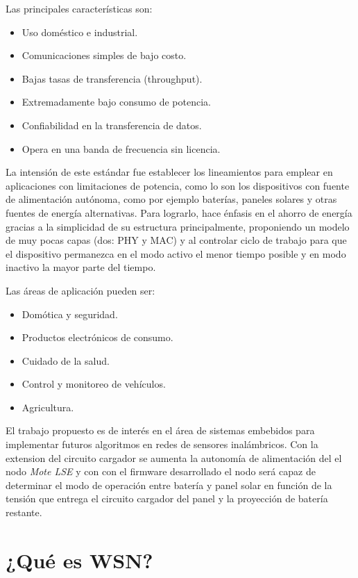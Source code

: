 \noindent Las principales características son:
		\begin{itemize}
			\item Uso doméstico e industrial.
			\item Comunicaciones simples de bajo costo. 
			\item Bajas tasas de transferencia (throughput).
			\item Extremadamente bajo consumo de potencia.
			\item Confiabilidad en la transferencia de datos.
			\item Opera en una banda de frecuencia sin licencia.
		\end{itemize}

La intensión de este estándar fue establecer los lineamientos para emplear en aplicaciones con limitaciones de potencia, como lo son los dispositivos con fuente de alimentación autónoma, como por ejemplo baterías, paneles solares y otras fuentes de energía alternativas. Para lograrlo, hace énfasis en el ahorro de energía gracias a la simplicidad de su estructura principalmente, proponiendo un modelo de muy pocas capas (dos: PHY y MAC) y al controlar ciclo de trabajo para que el dispositivo permanezca en el modo activo el menor tiempo posible y en modo inactivo la mayor parte del tiempo.

\noindent Las áreas de aplicación pueden ser:
		\begin{itemize}
			\item Domótica y seguridad.
			\item Productos electrónicos de consumo.
			\item Cuidado de la salud.
			\item Control y monitoreo de vehículos.
			\item Agricultura.
		\end{itemize}

El trabajo propuesto es de interés en el área de sistemas embebidos para implementar futuros algoritmos en redes de sensores inalámbricos. Con la extension del circuito cargador se aumenta la autonomía de alimentación del el nodo \textit{Mote LSE} y con con el firmware desarrollado el nodo será capaz de determinar el modo de operación entre batería y panel solar en función de la tensión que entrega el circuito cargador del panel y la proyección de batería restante.

\section{¿Qué es WSN?}
\label{sec:wsn}

